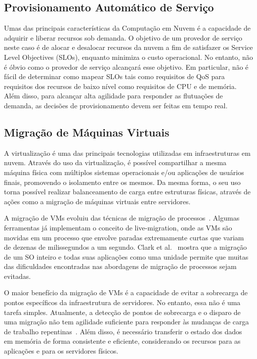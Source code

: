 	\subsection{Provisionamento Automático de Serviço}
	Umas das principais características da Computação em Nuvem é a capacidade de adquirir e liberar recursos sob demanda. O objetivo de um provedor de serviço neste caso é de alocar e desalocar recursos da nuvem a fim de satisfazer os Service Level Objectives (SLOs), enquanto minimiza o custo operacional.  No entanto, não é óbvio como o provedor de serviço alcançará esse objetivo. Em particular, não é fácil de determinar como mapear SLOs tais como requisitos de QoS para requisitos dos recursos de baixo nível como requisitos de CPU e de memória. Além disso, para alcançar alta agilidade para responder as flutuações de demanda, as decisões de provisionamento devem ser feitas em tempo real.
	
	\subsection{Migração de Máquinas Virtuais}
	A virtualização é uma das principais tecnologias utilizadas em infraestruturas em nuvem. Através do uso da virtualização, é possível compartilhar a mesma máquina física com múltiplos sistemas operacionais e/ou aplicações de usuários finais, promovendo o isolamento entre os mesmos. Da mesma forma, o seu uso torna possível realizar balanceamento de carga entre estruturas físicas, através de ações como a migração de máquinas virtuais entre servidores.
	
	A migração de VMs evoluiu das técnicas de migração de processos~\cite{Osman:2002}. Algumas ferramentas já implementam o conceito de live-migration, onde as VMs são movidas em um processo que envolve paradas extremamente curtas que variam de dezenas de milissegundos a um segundo. Clark et al.~\citeyearpar{Clark:2005} mostra que a migração de um SO inteiro e todas suas aplicações como uma unidade permite que muitas das dificuldades encontradas nas abordagens de migração de processos sejam evitadas.
	 
	O maior benefício da migração de VMs é a capacidade de evitar a sobrecarga de pontos específicos da infraestrutura de servidores. No entanto, essa não é uma tarefa simples. Atualmente, a detecção de pontos de sobrecarga e o disparo de uma migração não tem agilidade suficiente para responder às mudanças de carga de trabalho repentinas~\cite{stateOfArt:2010}. Além disso, é necessário transferir o estado dos dados em memória de forma consistente e eficiente, considerando os recursos para as aplicações e para os servidores físicos.
	
